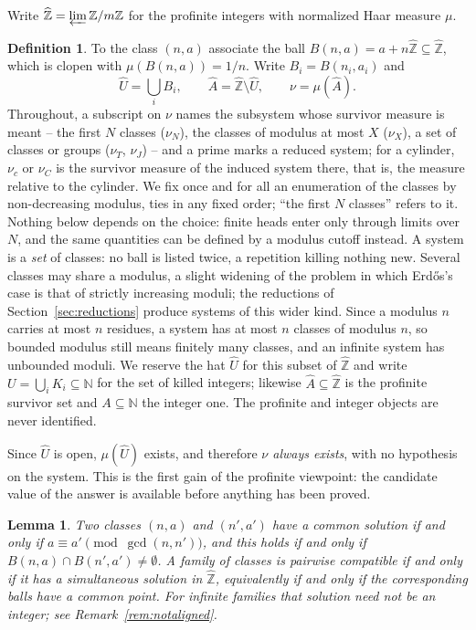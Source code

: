\documentclass[11pt]{article}
\theoremstyle{plain}
\newtheorem{lemma}[theorem]{Lemma}
\theoremstyle{definition}
\newtheorem{definition}[theorem]{Definition}
\newcommand{\Zhat}{\widehat{\mathbb{Z}}}
\newcommand{\N}{\mathbb{N}}
\newcommand{\cU}{\widehat{U}}
\newcommand{\Ahat}{\widehat{A}}
\begin{document}
Write $\Zhat=\varprojlim \mathbb{Z}/m\mathbb{Z}$ for the
profinite integers with normalized Haar measure $\mu$.

\begin{definition}
To the class $(n,a)$ associate the ball
$B(n,a)=a+n\Zhat\subseteq\Zhat$, which is clopen with
$\mu(B(n,a))=1/n$.  Write $B_i=B(n_i,a_i)$ and
\[
  \cU=\bigcup_i B_i,\qquad \Ahat=\Zhat\setminus\cU,\qquad \nu=\mu(\Ahat).
\]
Throughout, a subscript on $\nu$ names the subsystem whose
survivor measure is meant -- the first $N$ classes ($\nu_N$),
the classes of modulus at most $X$ ($\nu_X$), a set of classes
or groups ($\nu_T$, $\nu_J$) -- and a prime marks a reduced
system; for a cylinder, $\nu_c$ or $\nu_C$ is the survivor
measure of the induced system there, that is, the measure
relative to the cylinder.  We fix once and for all an enumeration of the
classes by non-decreasing modulus, ties in any fixed order;
``the first $N$ classes'' refers to it.  Nothing below depends on
the choice: finite heads enter only through limits over $N$, and
the same quantities can be defined by a modulus cutoff instead.
A system is a \emph{set} of classes: no ball is listed twice,
a repetition killing nothing new.  Several classes may share a
modulus, a slight widening of the problem in which Erd\H{o}s's
case is that of strictly increasing moduli; the reductions of
Section~\ref{sec:reductions} produce systems of this wider kind.  Since a modulus
$n$ carries at most $n$ residues, a system has at most $n$
classes of modulus $n$, so bounded modulus still means finitely
many classes, and an infinite system has unbounded moduli.  We reserve the hat $\cU$ for this subset of $\Zhat$
and write $U=\bigcup_i K_i\subseteq\N$ for the set of killed
integers; likewise $\Ahat\subseteq\Zhat$ is the profinite
survivor set and $A\subseteq\N$ the integer one.  The profinite
and integer objects are never identified.
\end{definition}

Since $\cU$ is open, $\mu(\cU)$ exists, and therefore
\emph{$\nu$ always exists}, with no hypothesis on the system.  This is the
first gain of the profinite viewpoint: the candidate value of
the answer is available before anything has been proved.

\begin{lemma}\label{lem:compat}
Two classes $(n,a)$ and $(n',a')$ have a common solution if and
only if $a\equiv a'\pmod{\gcd(n,n')}$, and this holds if and
only if $B(n,a)\cap B(n',a')\ne\emptyset$.  A family of classes
is pairwise compatible if and only if it has a simultaneous
solution \emph{in $\Zhat$}, equivalently if and only if the
corresponding balls have a common point.  For infinite families
that solution need not be an integer; see
Remark~\ref{rem:notaligned}.
\end{lemma}
\end{document}
